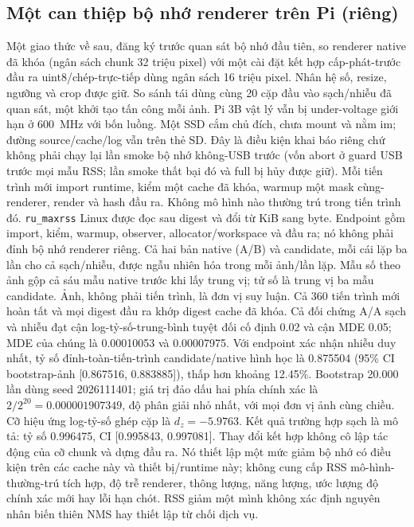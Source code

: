 \subsection{Một can thiệp bộ nhớ renderer trên Pi (riêng)}
\label{app:seg-pi3b-memory}
Một giao thức về sau, đăng ký trước quan sát bộ nhớ đầu tiên, so renderer native đã khóa (ngân sách chunk 32 triệu pixel) với một cài đặt kết hợp cấp-phát-trước đầu ra uint8/chép-trực-tiếp dùng ngân sách 16 triệu pixel. Nhân hệ số, resize, ngưỡng và crop được giữ. So sánh tái dùng cùng 20 cặp đầu vào sạch/nhiễu đã quan sát, một khởi tạo tấn công mỗi ảnh. Pi 3B vật lý vẫn bị under-voltage giới hạn ở 600~MHz với bốn luồng. Một SSD cắm chủ đích, chưa mount và nằm im; đường source/cache/log vẫn trên thẻ SD. Đây là điều kiện khai báo riêng chứ không phải chạy lại lần smoke bộ nhớ không-USB trước (vốn abort ở guard USB trước mọi mẫu RSS; lần smoke thất bại đó và full bị hủy được giữ). Mỗi tiến trình mới import runtime, kiểm một cache đã khóa, warmup một mask cùng-renderer, render và hash đầu ra. Không mô hình nào thường trú trong tiến trình đó. \texttt{ru\_maxrss} Linux được đọc sau digest và đổi từ KiB sang byte. Endpoint gồm import, kiểm, warmup, observer, allocator/workspace và đầu ra; nó không phải đỉnh bộ nhớ renderer riêng. Cả hai bản native (A/B) và candidate, mỗi cái lặp ba lần cho cả sạch/nhiễu, được ngẫu nhiên hóa trong mỗi ảnh/lần lặp. Mẫu số theo ảnh gộp cả sáu mẫu native trước khi lấy trung vị; tử số là trung vị ba mẫu candidate. Ảnh, không phải tiến trình, là đơn vị suy luận. Cả 360 tiến trình mới hoàn tất và mọi digest đầu ra khớp digest cache đã khóa. Cả đối chứng A/A sạch và nhiễu đạt cận log-tỷ-số-trung-bình tuyệt đối cố định 0.02 và cận MDE 0.05; MDE của chúng là 0.00010053 và 0.00007975. Với endpoint xác nhận nhiễu duy nhất, tỷ số đỉnh-toàn-tiến-trình candidate/native hình học là 0.875504 (95\% CI bootstrap-ảnh [0.867516, 0.883885]), thấp hơn khoảng 12.45\%. Bootstrap 20.000 lần dùng seed 2026111401; giá trị đảo dấu hai phía chính xác là $2/2^{20}=0.000001907349$, độ phân giải nhỏ nhất, với mọi đơn vị ảnh cùng chiều. Cỡ hiệu ứng log-tỷ-số ghép cặp là $d_z=-5.9763$. Kết quả trường hợp sạch là mô tả: tỷ số 0.996475, CI [0.995843, 0.997081]. Thay đổi kết hợp không cô lập tác động của cỡ chunk và dựng đầu ra. Nó thiết lập một mức giảm bộ nhớ có điều kiện trên các cache này và thiết bị/runtime này; không cung cấp RSS mô-hình-thường-trú tích hợp, độ trễ renderer, thông lượng, năng lượng, ước lượng độ chính xác mới hay lỗi hạn chót. RSS giảm một mình không xác định nguyên nhân biến thiên NMS hay thiết lập từ chối dịch vụ.

